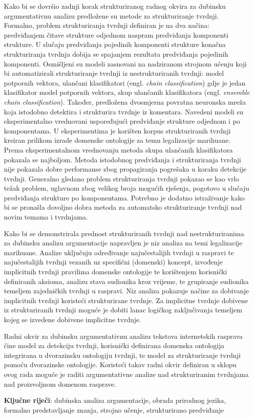 Kako bi se dovršio zadnji korak strukturiranog radnog okvira za dubinsku
argumentativnu analizu predložene su metode za strukturiranje tvrdnji.
Formalno, problem strukturiranja tvrdnji definiran je na dva načina:
predviđanjem čitave strukture odjednom naspram predviđanja komponenti
strukture.  U slučaju predviđanja pojedinih komponenti strukture konačna
strukturiranja tvrdnja dobija se spajanjem rezultata predviđanja pojedinih
komponenti. Osmišljeni su modeli zasnovani na nadziranom strojnom učenju koji
bi automatizirali strukturiranje tvrdnji iz nestrukturiranih tvrdnji: model
potpornih vektora, ulančani klasifikatori (engl.  \emph{chain classification})
gdje je jedan klasifikator model potpornih vektora, skup ulančanih
klasifikatora (engl. \emph{ensemble chain classification}).  Također,
predložena dvosmjerna povratna neuronska mreža koja istodobno detektira i
strukturira tvrdnje iz komentara.  Navedeni modeli su eksperimentalno vrednovani
uspoređujući predviđanje strukture odjednom i po komponentama.  U
eksperimentima je korišten korpus strukturiranih tvrdnji kreiran prilikom
izrade domenske ontologije za temu legalizacije marihuane.    Prema
eksperimentalnom vrednovanju metoda  skupa ulančanih klasifikatora pokazala se
najboljom. Metoda istodobnog predviđanja i strukturiranja tvrdnji nije pokazala
dobre performanse zbog propagiranja pogrešaka u koraku detekcije tvrdnji.
Generalno gledano problem strukturiranja tvrdnji pokazao se kao vrlo težak
problem, uglavnom zbog velikog broja mogućih rješenja, pogotovo u slučaju
predviđanja strukture po komponentama. Potrebno je dodatno istraživanje kako
bi se pronašla dovoljno dobra metoda za automatsko strukturiranje 
tvrdnji nad novim temama i tvrdnjama. 

Kako bi se demonstrirala prednost strukturiranih tvrdnji nad nestrukturiranima
za dubinsku analizu argumentacije napravljen je niz analiza na temi
legalizacije marihuane. Analize uključuju određivanje najučestalijih tvrdnji u
raspravi te najučestalijih tvrdnji vezanih uz specifični (domenski) koncept,
izvođenje implicitnih tvrdnji pravilima domenske ontologije te korištenjem
korisnički definiranih aksioma, analizu stava sudionika kroz vrijeme, te
grupiranje sudionika temeljem zajedničkih tvrdnji u raspravi.  Niz analiza
pokazuje načine za dobivanje implicitnih tvrdnji koristeći strukturirane
tvrdnje. Za implicitne tvrdnje dobivene iz strukturiranih tvrdnji moguće je
dobiti lanac logičkog zaključivanja temeljem kojeg se izvedene dobivene
implicitne tvrdnje. 

Radni okvir za dubinsku argumentativnu analizu tekstova internetskih rasprava
čine model za detekciju tvrdnji, korisnički definirana domenska ontologija integrirana
u dvorazinsku ontologiju tvrdnji, te model za strukturiranje
tvrdnji pomoću dvorazinske ontologije. Koristeći takav radni okvir definiran u sklopu
ovog rada moguće je raditi argumentativne analize nad strukturiranim tvrdnjama nad
proizvoljnom domenom rasprave.

\vspace{1cm}
\textbf{Ključne riječi}:  
dubinska analiza argumentacije, obrada prirodnog jezika,
formalno predstavljanje znanja, 
strojno učenje, strukturirano predviđanje
